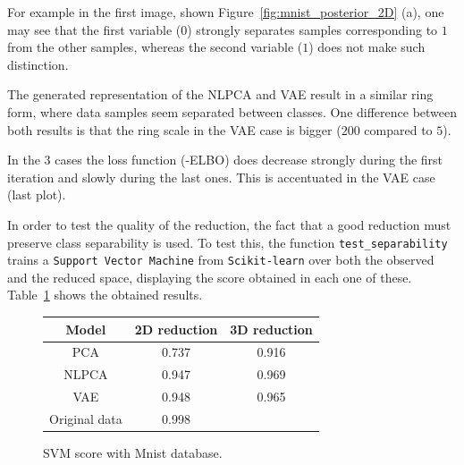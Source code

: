 For example in the first image, shown Figure~\ref{fig:mnist_posterior_2D} (a), one may see that the first variable (\(0\)) strongly separates samples corresponding to \(1\) from the other samples, whereas the second variable (\(1\)) does not make such distinction.

The generated representation of the NLPCA and VAE result in a similar ring form, where data samples seem separated between classes. One difference between both results is that the ring scale in the VAE case is bigger (\(200\) compared to \(5\)).

In the 3 cases the loss function (-ELBO) does decrease strongly during the first iteration and slowly during the last ones. This is accentuated in the VAE case (last plot).


In order to test the quality of the reduction, the fact that a good reduction must preserve class separability is used. To test this, the function \texttt{test\_separability} trains a \texttt{Support Vector Machine} from \texttt{Scikit-learn} over both the observed and the reduced space, displaying the score obtained in each one of these. Table~\ref{tab:mnist} shows the obtained results.

\begin{figure}
  \centering
  \begin{tabular}{ccc}
    \hline
    Model    & 2D reduction & 3D reduction \\\hline
    PCA      & 0.737 & 0.916\\
    NLPCA    & 0.947 & 0.969\\
    VAE      & 0.948 & 0.965\\
    \hline
    \hline
    Original data & 0.998 \\
    \hline
  \end{tabular}
  \caption{SVM score with Mnist database.}\label{tab:mnist}
\end{figure}

